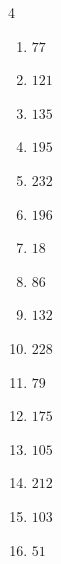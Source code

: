 \begin{multicols}{4}
\begin{enumerate}
  \item $77$


  \item $121$


  \item $135$


  \item $195$


  \item $232$


  \item $196$


  \item $18$


\columnbreak %

  \item $86$


  \item $132$


  \item $228$


  \item $79$


  \item $175$


  \item $105$


  \item $212$


  \item $103$


  \item $51$


\end{enumerate}
\end{multicols}

